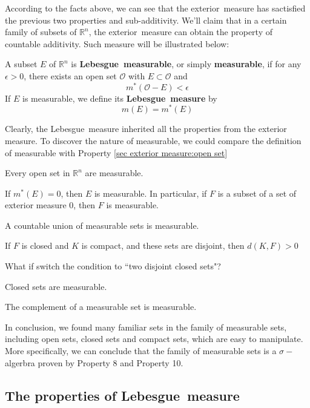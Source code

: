 \documentclass{ctexbook}
\begin{document}
According to the facts above, we can see that the exterior~measure has sactisfied the previous two properties and sub-additivity.
We'll claim that in a certain family of subsets of $\mathbb{R}^n$, the exterior~measure can obtain the property of countable
additivity. Such measure will be illustrated below:

\begin{define}
    A subset $E$ of $\mathbb{R}^n$ is \textbf{Lebesgue~measurable}, or simply \textbf{measurable}, if for any $\epsilon>0$,
    there exists an open set $\mathcal{O} $ with $E \subset \mathcal{O} $ and 
    \[m^*(\mathcal{O} - E) < \epsilon\]
    If $E$ is measurable, we define its \textbf{Lebesgue~measure} by \[m(E)=m^*(E)\]
\end{define}
Clearly, the Lebesgue~measure inherited all the properties from the exterior measure. To discover the nature of measurable,
we could compare the definition of measurable with Property \ref{sec exterior measure:open set}

\begin{prop}
    Every open set in $\mathbb{R}^n$ are measurable.
\end{prop}
\begin{prop}
    If $m^*(E)=0$, then $E$ is measurable. In particular, if $F$ is a subset of a set of exterior measure 0, then $F$ is measurable.
\end{prop}
\begin{prop}
    A countable union of measurable sets is measurable.
\end{prop}
\begin{lema}
    If $F$ is closed and $K$ is compact, and these sets are disjoint, then $d(K,F)>0$
\end{lema}
\noindent What if switch the condition to ``two disjoint closed sets"?
\begin{prop}
    Closed sets are measurable.
\end{prop}
\begin{prop}
    The complement of a measurable set is measurable.
\end{prop}
In conclusion, we found many familiar sets in the family of measurable sets, including open sets, closed sets and compact sets,
which are easy to manipulate. More specifically, we can conclude that the family of measurable sets is a $\sigma-$algerbra proven
by Property 8 and Property 10.

\subsection*{The properties of Lebesgue~measure}
\end{document}
